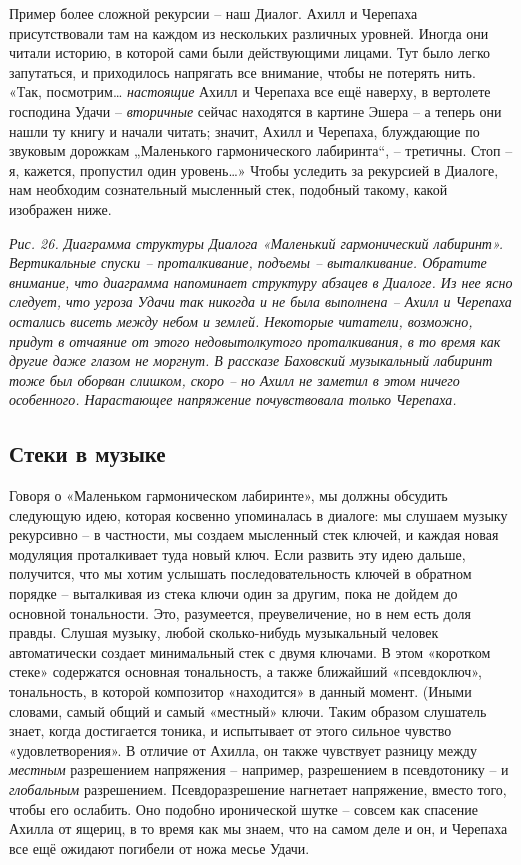 \documentclass[../main.tex]{subfiles}
\begin{document}
Пример более сложной рекурсии \--- наш Диалог. Ахилл и Черепаха присутствовали там на каждом из нескольких различных уровней. Иногда они читали историю, в которой сами были действующими лицами. Тут было легко запутаться, и приходилось напрягать все внимание, чтобы не потерять нить. «Так, посмотрим\ldots{} \emph{настоящие} Ахилл и Черепаха все ещё наверху, в вертолете господина Удачи \--- \emph{вторичные} сейчас находятся в картине Эшера \--- а теперь они нашли ту книгу и начали читать; значит, Ахилл и Черепаха, блуждающие по звуковым дорожкам „Маленького гармонического лабиринта``, \--- третичны. Стоп \--- я, кажется, пропустил один уровень\ldots» Чтобы уследить за рекурсией в Диалоге, нам необходим сознательный мысленный стек, подобный такому, какой изображен ниже.

\emph{Рис. 26. Диаграмма структуры Диалога «Маленький гармонический лабиринт». Вертикальные спуски \--- проталкивание, подъемы \--- выталкивание. Обратите внимание, что диаграмма напоминает структуру абзацев в Диалоге. Из нее ясно следует, что угроза Удачи так никогда и не была выполнена \--- Ахилл и Черепаха остались висеть между небом и землей. Некоторые читатели, возможно, придут в отчаяние от этого недовытолкутого проталкивания, в то время как другие даже глазом не моргнут. В рассказе Баховский музыкальный лабиринт тоже был оборван слишком, скоро \--- но Ахилл не заметил в этом ничего особенного. Нарастающее напряжение почувствовала только Черепаха.}


\subsection{Стеки в музыке}

Говоря о «Маленьком гармоническом лабиринте», мы должны обсудить следующую идею, которая косвенно упоминалась в диалоге: мы слушаем музыку рекурсивно \--- в частности, мы создаем мысленный стек ключей, и каждая новая модуляция проталкивает туда новый ключ. Если развить эту идею дальше, получится, что мы хотим услышать последовательность ключей в обратном порядке \--- выталкивая из стека ключи один за другим, пока не дойдем до основной тональности. Это, разумеется, преувеличение, но в нем есть доля правды. Слушая музыку, любой сколько-нибудь музыкальный человек автоматически создает минимальный стек с двумя ключами. В этом «коротком стеке» содержатся основная тональность, а также ближайший «псевдоключ», тональность, в которой композитор «находится» в данный момент. (Иными словами, самый общий и самый «местный» ключи. Таким образом слушатель знает, когда достигается тоника, и испытывает от этого сильное чувство «удовлетворения». В отличие от Ахилла, он также чувствует разницу между \emph{местным} разрешением напряжения \--- например, разрешением в псевдотонику \--- и \emph{глобальным} разрешением. Псевдоразрешение нагнетает напряжение, вместо того, чтобы его ослабить. Оно подобно иронической шутке \--- совсем как спасение Ахилла от ящериц, в то время как мы знаем, что на самом деле и он, и Черепаха все ещё ожидают погибели от ножа месье Удачи.
\end{document}
